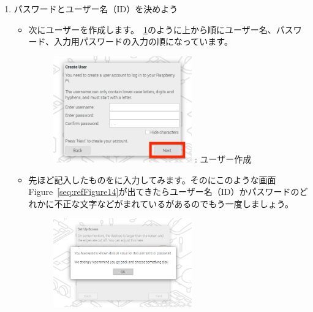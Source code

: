 \documentclass[a4paper,12pt]{jarticle}
\begin{document}
\begin{enumerate}
    \item             
          パスワードとユーザー名（ID）を決めよう
                \begin{itemize}
                \item                                      
                次にユーザーを作成します。~\ref{seq:refFigure11}のように上から順にユーザー名、パスワード、入力用パスワードの入力の順になっています。
              
        
                    \begin{figure}[h]
                      \centering
                      \begin{minipage}{5.228cm}
                        {\upshape
                          \includegraphics[width=6.000cm]{sw_image03.png}
                          \newline
                          {\theFigure\label{seq:refFigure11}}:
                          ユーザー作成}
                      \end{minipage}
                    \end{figure}
                  \end{itemize}
                  \begin{itemize}
                  \item
                      先ほど記入したものをに入力してみます。そのにこのような画面Figure~\ref{seq:refFigure14}が出てきたらユーザー名（ID）かパスワードのどれかに不正な文字などがまれているがあるのでもう一度しましょう。
                      \begin{figure}[h]
                        \centering
                        \begin{minipage}{5.228cm}
                          {\upshape
                            \includegraphics[width=6.000cm]{sw_image04.png}
}
\end{minipage}
\end{figure}
\end{itemize}
\end{enumerate}
\end{document}
